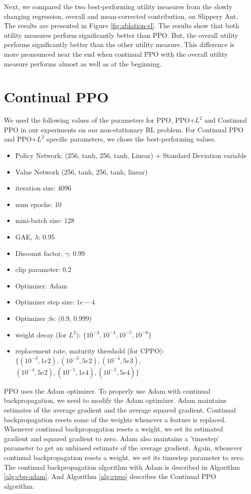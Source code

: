 \documentclass[review, number,3p]{elsarticle}
\begin{document}
Next, we compared the two best-performing utility measures from the slowly changing regression, overall and mean-corrected contribution, on Slippery Ant. The results are presented in Figure \ref{fig:ablation-rl}. The results show that both utility measures perform significantly better than PPO. But, the overall utility performs significantly better than the other utility measure. This difference is more pronounced near the end when continual PPO with the overall utility measure performs almost as well as at the beginning.

\section{Continual PPO}
\label{app:cppo}

We used the following values of the parameters for PPO, PPO+$L^2$ and Continual PPO in our experiments on our non-stationary RL problem. For Continual PPO and PPO+$L^2$ specific parameters, we chose the best-performing values.
\begin{itemize}
    \item Policy Network: (256, tanh, 256, tanh, Linear) + Standard Deviation variable
    \item Value Network (256, tanh, 256, tanh, linear)
    \item iteration size: 4096
    \item num epochs: 10
    \item mini-batch size: 128
    \item GAE, $\lambda$: 0.95
    \item Discount factor, $\gamma$: 0.99
    \item clip parameter: 0.2
    \item Optimizer: Adam
    \item Optimizer step size: $1e-4$
    \item Optimizer $\beta$s: (0.9, 0.999)
    \item weight decay (for $L^2$): $\{10^{-3}, 10^{-4}, 10^{-5}, 10^{-6}\}$
    \item replacement rate, maturity threshold (for CPPO): $\{(10^{-3}, 1e2), (10^{-3}, 5e2), (10^{-4}, 5e3)$, \\ $(10^{-4}, 5e2), (10^{-5}, 1e4), (10^{-5}, 5e4)\}$
\end{itemize}


PPO uses the Adam optimizer. 
To properly use Adam with continual backpropagation, we need to modify the Adam optimizer.
Adam maintains estimates of the average gradient and the average squared gradient. 
Continual backpropagation resets some of the weights whenever a feature is replaced. 
Whenever continual backpropagation resets a weight, we set its estimated gradient and squared gradient to zero. 
Adam also maintains a 'timestep' parameter to get an unbiased estimate of the average gradient. 
Again, whenever continual backpropagation resets a weight, we set its timestep parameter to zero.
The continual backpropagation algorithm with Adam is described in Algorithm \ref{alg:cbp-adam}.
And Algorithm \ref{alg:cppo} describes the Continual PPO algorithm.
\end{document}
